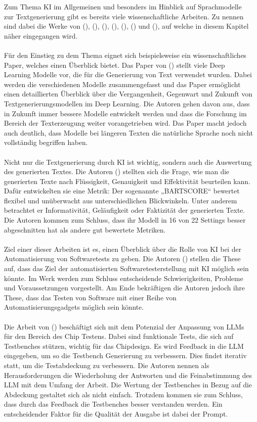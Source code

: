 \documentclass[12pt,toc=bib,toc=listof]{scrreprt}
\begin{document}
Zum Thema KI im Allgemeinen und besonders im Hinblick auf Sprachmodelle zur Textgenerierung gibt es bereits viele wissenschaftliche Arbeiten. Zu nennen sind dabei die Werke von (\cite{Iqbal2022}), (\cite{Yuan2021}), (\cite{Khan2024}), (\cite{Bhandari2024}), (\cite{Gu2024}), (\cite{Chen2024}) und (\cite{Wang2024}), auf welche in diesem Kapitel näher eingegangen wird.\\
\\
Für den Einstieg zu dem Thema eignet sich beispielsweise ein wissenschaftliches Paper, welches einen Überblick bietet. Das Paper von (\cite{Iqbal2022}) stellt viele Deep Learning Modelle vor, die für die Generierung von Text verwendet wurden. Dabei werden die verschiedenen Modelle zusammengefasst und das Paper ermöglicht einen detaillierten Überblick über die Vergangenheit, Gegenwart und Zukunft von Textgenerierungsmodellen im Deep Learning. Die Autoren gehen davon aus, dass in Zukunft immer bessere Modelle entwickelt werden und dass die Forschung im Bereich der Texterzeugung weiter vorangetrieben wird. Das Paper macht jedoch auch deutlich, dass Modelle bei längeren Texten die natürliche Sprache noch nicht vollständig begriffen haben.\\
\\
Nicht nur die Textgenerierung durch KI ist wichtig, sondern auch die Auswertung des generierten Textes. Die Autoren (\cite{Yuan2021}) stellten sich die Frage, wie man die generierten Texte nach Flüssigkeit, Genauigkeit und Effektivität beurteilen kann. Dafür entwickelten sie eine Metrik: Der sogenannte „BARTSCORE“ bewertet flexibel und unüberwacht aus unterschiedlichen Blickwinkeln. Unter anderem betrachtet er Informativität, Geläufigkeit oder Faktizität der generierten Texte. Die Autoren kommen zum Schluss, dass ihr Modell in 16 von 22 Settings besser abgeschnitten hat als andere gut bewertete Metriken.\\
\\
Ziel einer dieser Arbeiten ist es, einen Überblick über die Rolle von KI bei der Automatisierung von Softwaretests zu geben. Die Autoren (\cite{Khan2024}) stellen die These auf, dass das Ziel der automatisierten Softwaretesterstellung mit KI möglich sein könnte. Im Werk werden zum Schluss entscheidende Schwierigkeiten, Probleme und Voraussetzungen vorgestellt. Am Ende bekräftigen die Autoren jedoch ihre These, dass das Testen von Software mit einer Reihe von Automatisierungsgadgets möglich sein könnte.\\
\\
Die Arbeit von (\cite{Bhandari2024}) beschäftigt sich mit dem Potenzial der Anpassung von LLMs für den Bereich des Chip Testens. Dabei sind funktionale Tests, die sich auf Testbenches stützen, wichtig für das Chipdesign. Es wird Feedback in die LLM eingegeben, um so die Testbench Generierung zu verbessern. Dies findet iterativ statt, um die Testabdeckung zu verbessern. Die Autoren nennen als Herausforderungen die Wiederholung der Antworten und die Feinabstimmung des LLM mit dem Umfang der Arbeit. Die Wertung der Testbenches in Bezug auf die Abdeckung gestaltet sich als nicht einfach. Trotzdem kommen sie zum Schluss, dass durch das Feedback die Testbenches besser verstanden werden. Ein entscheidender Faktor für die Qualität der Ausgabe ist dabei der Prompt.\\
\end{document}
